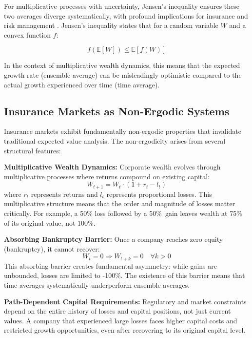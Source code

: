 \documentclass[11pt,letterpaper]{article}
\newcommand{\E}{\mathbb{E}}
\begin{document}
For multiplicative processes with uncertainty, Jensen's inequality ensures these two averages diverge systematically, with profound implications for insurance and risk management \citep{peters2016evaluating}. Jensen's inequality states that for a random variable $W$ and a convex function $f$:

\begin{equation}
f(\E[W]) \leq \E[f(W)]
\end{equation}

In the context of multiplicative wealth dynamics, this means that the expected growth rate (ensemble average) can be misleadingly optimistic compared to the actual growth experienced over time (time average).

\subsection{Insurance Markets as Non-Ergodic Systems}

Insurance markets exhibit fundamentally non-ergodic properties that invalidate traditional expected value analysis. The non-ergodicity arises from several structural features:

\textbf{Multiplicative Wealth Dynamics:} Corporate wealth evolves through multiplicative processes where returns compound on existing capital:
\begin{equation}
W_{t+1} = W_t \cdot (1 + r_t - l_t)
\end{equation}
where $r_t$ represents returns and $l_t$ represents proportional losses. This multiplicative structure means that the order and magnitude of losses matter critically. For example, a 50\% loss followed by a 50\%~gain leaves wealth at 75\% of its original value, not 100\%.

\textbf{Absorbing Bankruptcy Barrier:} Once a company reaches zero equity (bankruptcy), it cannot recover:
\begin{equation}
W_t = 0 \Rightarrow W_{t+k} = 0 \quad \forall k > 0
\end{equation}
This absorbing barrier creates fundamental asymmetry: while gains are unbounded, losses are limited to -100\%. The existence of this barrier means that time averages systematically underperform ensemble averages.

\textbf{Path-Dependent Capital Requirements:} Regulatory and market constraints depend on the entire history of losses and capital positions, not just current values. A company that experienced large losses faces higher capital costs and restricted growth opportunities, even after recovering to its original capital level.
\end{document}
